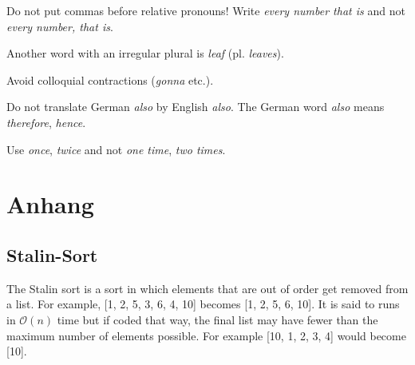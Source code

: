 \documentclass[a4paper]{article}
\begin{document}
Do not put commas before relative pronouns! Write \emph{every number that is} and not \emph{every number, that is}.

Another word with an irregular plural is \emph{leaf} (pl. \emph{leaves}).

Avoid colloquial contractions (\emph{gonna} etc.).

Do not translate German \emph{also} by English \emph{also}. The German word \emph{also} means \emph{therefore}, \emph{hence}.

Use \emph{once}, \emph{twice} and not \emph{one time}, \emph{two times}.


\newpage
\section{Anhang}
\subsection{Stalin-Sort}
The Stalin sort is a sort in which elements that are out of order get removed from a list. For example, [1, 2, 5, 3, 6, 4, 10] becomes [1, 2, 5, 6, 10]. It is said to runs in $\mathcal{O}(n)$ time but if coded that way, the final list may have fewer than the maximum number of elements possible. For example [10, 1, 2, 3, 4] would become [10].
\end{document}

